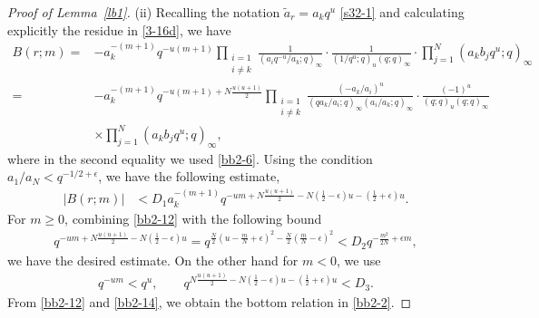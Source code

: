 \documentclass[pdftex]{sigma}
\numberwithin{equation}{section}
\def\e{\epsilon}
\def\i{\infty}
\begin{document}
\begin{proof}[Proof of Lemma~\ref{lb1}]
 (ii)
 Recalling the notation $\tilde{a}_r=a_k q^{u}$ \eqref{s32-1} and calculating explicitly the residue in \eqref{3-16d}, we have
 \begin{align*}
 B(r;m)=&-a_k^{-(m+1)}q^{-u(m+1)}
 \prod_{\substack{i=1\\ i\neq k}}
 \frac{1}{(a_iq^{-u}/a_k ;q)_{\i}}\cdot
 \frac{1}{(1/q^u;q)_u (q;q)_{\i}}\cdot
 \prod_{j=1}^N(a_kb_jq^{u};q)_{\i}
 \\
 =&
 -a_k^{-(m+1)}q^{-u (m+1)+N\frac{u(u+1)}{2}}
 \prod_{\substack{i=1\\ i\neq k}}
 \frac{(-a_k/a_i)^u}{(q a_k/a_i;q)_{\i}(a_i/a_k;q)_\infty}\cdot
 \frac{(-1)^u}{(q;q)_u (q;q)_{\i}}
 \\
 &\times\prod_{j=1}^N(a_k b_jq^{u};q)_{\i},
 \end{align*}
 where in the second equality we used \eqref{bb2-6}.
 Using the condition $a_1/a_N< q^{-1/2+\e}$, we have the following estimate,
 \begin{align}
 \label{bb2-12}
 |B(r;m)|&<D_1 a_k^{-(m+1)} q^{-u m +N\frac{u(u+1)}{2}-N\left(\frac12-\e\right)u -\left(\frac12+\e\right)u}.
 \end{align}
 For $m\ge 0$, combining \eqref{bb2-12} with
 the following bound
 \begin{align*}
 q^{-u m+N\frac{u(u+1)}{2}-N\left(\frac12-\e\right)u}
 =
 q^{\frac{N}{2}\left(u-\frac{m}{N}+\e\right)^2-\frac{N}{2}\left(\frac{m}{N}-\e\right)^2}
 <D_2
 q^{-\frac{m^2}{2N}+\e m},
 \end{align*}
 we have the desired estimate. On the other hand
 for $m<0$, we use
 \begin{align}
 \label{bb2-14}
 q^{-u m}<q^{u},
 \qquad
 q^{N\frac{u(u+1)}{2}-N\left(\frac12-\e\right)u -\left(\frac12+\e\right)u}<D_3.
 \end{align}
 From \eqref{bb2-12} and \eqref{bb2-14}, we obtain
 the bottom relation in \eqref{bb2-2}.
\end{proof}
\end{document}
